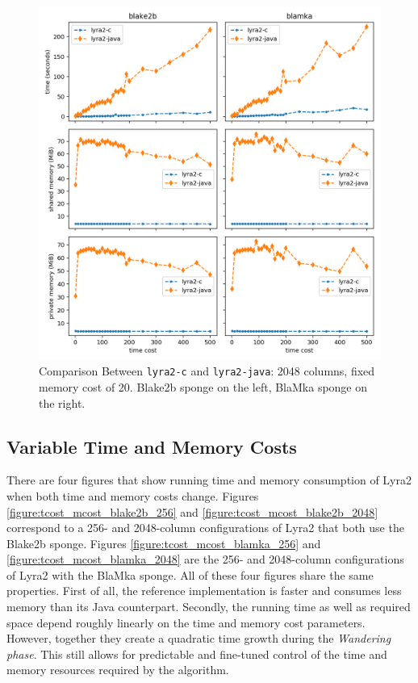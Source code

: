 \begin{figure}[H]
    \centering
    \includegraphics[width=\linewidth,keepaspectratio]{figures/tcost_2048}
    \caption{Comparison Between \texttt{lyra2-c} and \texttt{lyra2-java}: 2048 columns, fixed memory cost of 20. Blake2b sponge on the left, BlaMka sponge on the right.}
    \label{figure:tcost_2048}
\end{figure}

\subsection{Variable Time and Memory Costs}
\label{sec:no-fixed-costs}

There are four figures that show running time and memory consumption of Lyra2 when both time and memory costs change. Figures \ref{figure:tcost_mcost_blake2b_256} and \ref{figure:tcost_mcost_blake2b_2048} correspond to a 256- and 2048-column configurations of Lyra2 that both use the Blake2b sponge. Figures \ref{figure:tcost_mcost_blamka_256} and \ref{figure:tcost_mcost_blamka_2048} are the 256- and 2048-column configurations of Lyra2 with the BlaMka sponge. All of these four figures share the same properties. First of all, the reference implementation is faster and consumes less memory than its Java counterpart. Secondly, the running time as well as required space depend roughly linearly on the time and memory cost parameters. However, together they create a quadratic time growth during the \emph{Wandering phase}. This still allows for predictable and fine-tuned control of the time and memory resources required by the algorithm.

